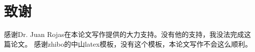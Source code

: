 %

\chapter{致谢}

感谢Dr. Juan Rojas在本论文写作提供的大力支持。没有他的支持，我没法完成这篇论文。
感谢zhibo的中山latex模板，没有这个模板，本论文写作不会这么顺利。

